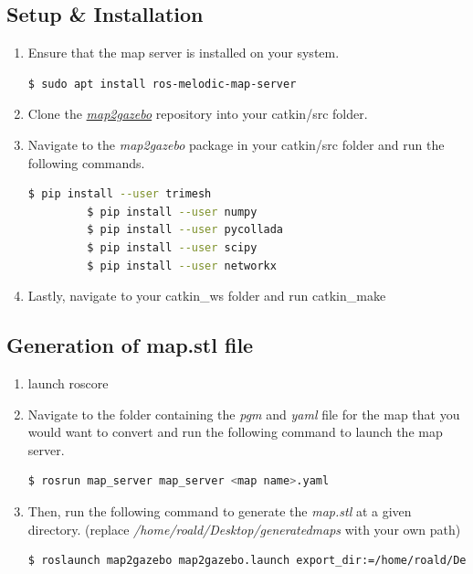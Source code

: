 \documentclass[11pt]{article}
\begin{document}
\subsection{Setup \& Installation}

\begin{enumerate}
 \item{
       Ensure that the map server is installed on your system.
       \begin{lstlisting}[language=bash]
     $ sudo apt install ros-melodic-map-server
       \end{lstlisting}
       }
 \item{
       Clone the \href{https://github.com/SynapseProgramming/map2gazebo.git
       }{\emph{map2gazebo}} repository into your catkin/src folder.
       
       }
 \item{
       Navigate to the \emph{map2gazebo} package in your catkin/src folder and run the following commands.
       
       \begin{lstlisting}[language=bash]
         $ pip install --user trimesh
         $ pip install --user numpy
         $ pip install --user pycollada
         $ pip install --user scipy
         $ pip install --user networkx
       \end{lstlisting}
       }
 \item{
       Lastly, navigate to your catkin\_ws folder and run catkin\_make
       }
\end{enumerate}

\subsection{Generation of map.stl file}

\begin{enumerate}
 \item{launch roscore}
 \item {
       Navigate to the folder containing the \emph{pgm} and \emph{yaml} file for the map that you would want to convert and run the following command to launch the map server.
       \begin{lstlisting}[language=bash]
        $ rosrun map_server map_server <map name>.yaml
       \end{lstlisting}
       }
 \item{
       Then, run the following command to generate the \emph{map.stl} at a given directory. (replace
       \emph{/home/roald/Desktop/generatedmaps} with your own path)
       
       \begin{lstlisting}[language=bash]
        $ roslaunch map2gazebo map2gazebo.launch export_dir:=/home/roald/Desktop/generatedmaps
        \end{lstlisting}
       }
\end{enumerate}
\end{document}
